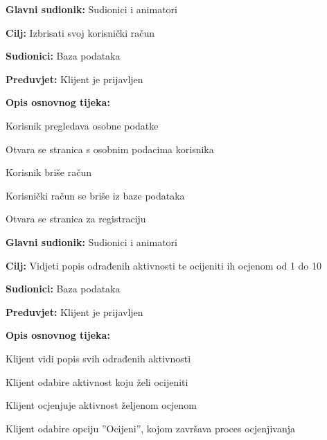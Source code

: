 \noindent {}
\begin{packed_item}

	\item \textbf{Glavni sudionik: }Sudionici i animatori
	\item  \textbf{Cilj:} Izbrisati svoj korisnički račun
	\item  \textbf{Sudionici:} Baza podataka
	\item  \textbf{Preduvjet:} Klijent je prijavljen
	\item  \textbf{Opis osnovnog tijeka:}

	\item[] \begin{packed_enum}

				\item Korisnik pregledava osobne podatke
				\item Otvara se stranica s osobnim podacima korisnika
				\item Korisnik briše račun
				\item Korisnički račun se briše iz baze podataka
				\item Otvara se stranica za registraciju
	\end{packed_enum}



\end{packed_item}
\vspace{5mm} %

\noindent {}
\begin{packed_item}

	\item \textbf{Glavni sudionik: }Sudionici i animatori
	\item  \textbf{Cilj:} Vidjeti popis odrađenih aktivnosti te ocijeniti ih ocjenom od 1 do 10
	\item  \textbf{Sudionici:} Baza podataka
	\item  \textbf{Preduvjet:} Klijent je prijavljen
	\item  \textbf{Opis osnovnog tijeka:}

	\item[] \begin{packed_enum}

				\item Klijent vidi popis svih odrađenih aktivnosti
				\item Klijent odabire aktivnost koju želi ocijeniti
				\item Klijent ocjenjuje aktivnost željenom ocjenom
				\item Klijent odabire opciju ”Ocijeni”, kojom završava proces ocjenjivanja
	\end{packed_enum}


\end{packed_item}
\vspace{5mm} %

